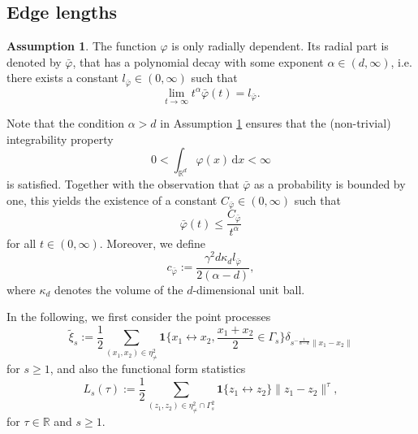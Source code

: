 \documentclass{article}
\theoremstyle{definition}
\newtheorem{ass}[theorem]{Assumption}
\numberwithin{equation}{section}
\theoremstyle{remark}
\begin{document}
\subsection{Edge lengths}

\begin{ass}\label{edgelength-ass1}
	The function $\varphi$ is only radially dependent. Its radial part is denoted by $\bar{\varphi}$, that has a polynomial decay with some exponent $\alpha \in (d, \infty)$, i.e. there exists a constant $l_{\bar{\varphi}}\in(0,\infty)$ such that  
\begin{equation}\label{eqn:assumption_phi}
\lim_{t\to\infty} t^{\alpha} \bar{\varphi}(t)=l_{\bar{\varphi}}.
\end{equation}
\end{ass}

Note that the condition $\alpha>d$ in Assumption \ref{edgelength-ass1} ensures that the (non-trivial) integrability property
$$ 0 < \int_{\mathbb{R}^d} \varphi (x) \, \mathrm{d} x< \infty$$
is satisfied.
Together with the observation that $\bar{\varphi}$ as a probability is bounded by one, this yields the existence of a constant $C_{\bar{\varphi}}\in(0,\infty)$ such that
\begin{equation}\label{eqn:Upper_bound_bar_varphi}
\bar{\varphi}(t) \leq \frac{C_{\bar{\varphi}}}{t^\alpha}
\end{equation}
for all $t\in(0,\infty)$. Moreover, we define
$$
c_{\bar{\varphi}} := \frac{\gamma^2 d \kappa_d l_{\bar{\varphi}}}{2(\alpha-d)},
$$
where $\kappa_d$ denotes the volume of the $d$-dimensional unit ball.

In the following, we first consider the point processes
$$
\tilde{\xi}_s := \frac{1}{2} \sum_{(x_1,x_2)\in\eta_{\neq}^2} \mathbf{1}\bigg\{x_1\leftrightarrow x_2, \frac{x_1+x_2}{2}\in\Gamma_s \bigg\} \delta_{s^{-\frac{1}{\alpha-d}}\|x_1-x_2\|}
$$
for $s\geq 1$, and also the functional form statistics 
\begin{equation}\label{deflstau}
    L_s (\tau):=\frac{1}{2} \sum_{(z_1, z_2) \in \eta^2_{\neq} \cap \Gamma_s^2} \mathbf{1}\{ z_1 \leftrightarrow z_2 \} \| z_1- z_2 \|^\tau, 
\end{equation}
for $\tau \in \mathbb{R}$ and $s\ge1$.
\end{document}
